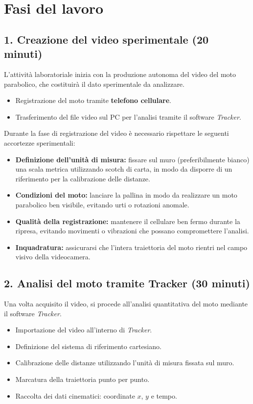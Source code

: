 \documentclass[11pt,a4paper]{article}
\begin{document}
\section*{Fasi del lavoro}

\subsection*{1. Creazione del video sperimentale (20 minuti)}
L’attività laboratoriale inizia con la produzione autonoma del video del moto parabolico, che costituirà il dato sperimentale da analizzare.

\begin{itemize}
    \item Registrazione del moto tramite \textbf{telefono cellulare}.
    \item Trasferimento del file video sul PC per l’analisi tramite il software \textit{Tracker}.
\end{itemize}

Durante la fase di registrazione del video è necessario rispettare le seguenti accortezze sperimentali:

\begin{itemize}
    \item \textbf{Definizione dell’unità di misura:} fissare sul muro (preferibilmente bianco) una scala metrica utilizzando scotch di carta, in modo da disporre di un riferimento per la calibrazione delle distanze.
    \item \textbf{Condizioni del moto:} lanciare la pallina in modo da realizzare un moto parabolico ben visibile, evitando urti o rotazioni anomale.
    \item \textbf{Qualità della registrazione:} mantenere il cellulare ben fermo durante la ripresa, evitando movimenti o vibrazioni che possano compromettere l’analisi.
    \item \textbf{Inquadratura:} assicurarsi che l’intera traiettoria del moto rientri nel campo visivo della videocamera.
\end{itemize}

\subsection*{2. Analisi del moto tramite Tracker (30 minuti)}
Una volta acquisito il video, si procede all’analisi quantitativa del moto mediante il software \textit{Tracker}.

\begin{itemize}
    \item Importazione del video all’interno di \textit{Tracker}.
    \item Definizione del sistema di riferimento cartesiano.
    \item Calibrazione delle distanze utilizzando l’unità di misura fissata sul muro.
    \item Marcatura della traiettoria punto per punto.
    \item Raccolta dei dati cinematici: coordinate $x$, $y$ e tempo.
\end{itemize}
\end{document}
